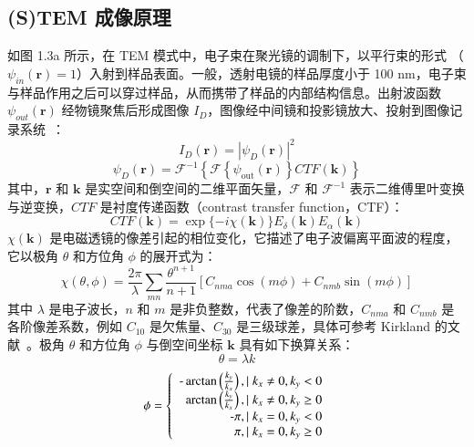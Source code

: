 \subsection{(S)TEM 成像原理}
如图 1.3a 所示，在 TEM 模式中，电子束在聚光镜的调制下，以平行束的形式 （$\psi_{in} (\boldsymbol{r})=1$）入射到样品表面。一般，透射电镜的样品厚度小于 100 nm，电子束与样品作用之后可以穿过样品，从而携带了样品的内部结构信息。出射波函数 $\psi_{out} (\boldsymbol{r})$ 经物镜聚焦后形成图像 $I_D$，图像经中间镜和投影镜放大、投射到图像记录系统~\cite{Gomez2010}：
\begin{equation}I_{D}(\boldsymbol{r})=\left|\psi_{D}(\boldsymbol{r})\right|^{2}\end{equation}
\begin{equation}\psi_{D}(\boldsymbol{r})=\mathcal{F}^{-1}\left\{\mathcal{F}\left\{\psi_{\text {out}}(\boldsymbol{r})\right\} \textit{CTF}(\boldsymbol{k})\right\}\end{equation}
其中，$\boldsymbol{r}$ 和 $\boldsymbol{k}$ 是实空间和倒空间的二维平面矢量，$\mathcal{F}$ 和 $\mathcal{F}^{-1}$ 表示二维傅里叶变换与逆变换，$\textit{CTF}$ 是衬度传递函数（contrast transfer function，CTF）：
\begin{equation}\textit{CTF} (\boldsymbol{k})=\exp \{-i \chi(\boldsymbol{k})\} E_{\delta}(\boldsymbol{k}) E_{\alpha}(\boldsymbol{k})\end{equation}
$\chi(\boldsymbol{k})$ 是电磁透镜的像差引起的相位变化，它描述了电子波偏离平面波的程度，它以极角 $\theta$ 和方位角 $\phi$ 的展开式为：
\begin{equation}\chi(\theta, \phi)=\frac{2 \pi}{\lambda} \sum_{m n} \frac{\theta^{n+1}}{n+1}\left[C_{n m a} \cos (m \phi)+C_{n m b} \sin (m \phi)\right]\end{equation}
其中 $\lambda$ 是电子波长，$n$ 和 $m$ 是非负整数，代表了像差的阶数，$C_{nma}$ 和 $C_{nmb}$ 是各阶像差系数，例如 $C_{10}$ 是欠焦量、$C_{30}$ 是三级球差，具体可参考 Kirkland 的文献~\cite{Kirkland2011}。极角 $\theta$ 和方位角 $\phi$ 与倒空间坐标 $\boldsymbol{k}$ 具有如下换算关系：
\begin{equation}\theta=\lambda k\end{equation}
\begin{equation}\phi=\left\{ \begin{array}{r}
\textnormal{-}\arctan \left(\frac{k_{y}}{k_{x}}\right), \mid k_{x} \neq 0, k_{y}<0 \\
\arctan \left(\frac{k_{y}}{k_{x}}\right), \mid k_{x} \neq 0, k_{y} \geq 0 \\
\textnormal{-}\pi, \mid k_{x}=0, k_{y}<0 \\
\pi, \mid k_{x}=0, k_{y} \geq 0
\end{array} \right. \end{equation}
